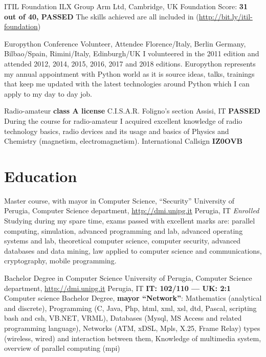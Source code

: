 \documentclass[10pt,a4paper,sans]{moderncv}
\begin{document}
    {ITIL Foundation}
    {ILX Group}{
    Arm Ltd, Cambridge, UK}
    {Foundation Score: \textbf{31 out of 40, PASSED}}
    {The skills achieved are all included in
    (\url{http://bit.ly/itil-foundation})}

    {Europython Conference}
    {Volunteer, Attendee}
    {Florence/Italy, Berlin Germany, Bilbao/Spain, Rimini/Italy, Edinburgh/UK}
    {}
    {I volunteered in the 2011 edition and attended 2012, 2014, 2015, 2016,
    2017 and 2018 editions. Europython represents my annual appointment with
    Python world as it is source ideas, talks, trainings that keep me updated
    with the latest technologies around Python which I can apply to my day to
    day job.}

    {Radio-amateur \textbf{class A license}}
    {C.I.S.A.R. Foligno's section}
    {Assisi, IT}
    {\textbf{PASSED}}
    {During the course for radio-amateur I acquired excellent knowledge of
    radio technology basics, radio devices and its usage and basics of Physics
    and Chemistry (magnetism, electromagnetism). International Callsign
    \textbf{IZ0OVB}}

\section{Education}
    {Master course, with mayor in Computer Science, ``Security''}
    {University of Perugia, Computer Science department,
        \url{http://dmi.unipg.it}}
    {Perugia, IT}
    {\textit{Enrolled}}
    {Studying during my spare time, exams passed with excellent marks are:
    parallel computing, simulation, advanced programming and lab,
    advanced operating systems and lab, theoretical computer science, computer
    security, advanced databases and data mining, law applied to computer
    science and communications, cryptography, mobile programming.}

    {Bachelor Degree in Computer Science}
    {University of Perugia, Computer Science department,
        \url{http://dmi.unipg.it}}
    {Perugia, IT}
    {\textbf{IT\@: 102/110 --- UK\@: 2:1}}
    {Computer science Bachelor Degree, \textbf{mayor ``Network''}: Mathematics
    (analytical and discrete), Programming (C, Java, Php, html, xml, xsl, dtd,
    Pascal, scripting bash and csh, VB.NET, VRML), Databases (Mysql, MS Access
    and related programming language), Networks (ATM, xDSL, Mpls, X.25, Frame
    Relay) types (wireless, wired) and interaction between them, Knowledge of
    multimedia system, overview of parallel computing (mpi)}
\end{document}
